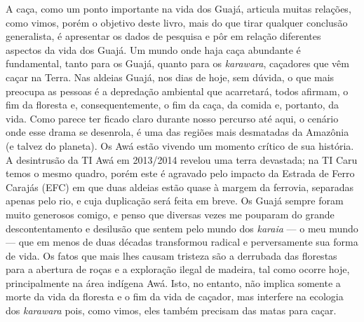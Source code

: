 A caça, como um ponto importante na vida dos Guajá, articula muitas
relações, como vimos, porém o objetivo deste livro, mais do que tirar
qualquer conclusão generalista, é apresentar os dados de pesquisa e pôr
em relação diferentes aspectos da vida dos Guajá. Um mundo onde haja
caça abundante é fundamental, tanto para os Guajá, quanto para os
\emph{karawara}, caçadores que vêm caçar na Terra. Nas aldeias Guajá,
nos dias de hoje, sem dúvida, o que mais preocupa as pessoas é a
depredação ambiental que acarretará, todos afirmam, o fim da floresta e,
consequentemente, o fim da caça, da comida e, portanto, da vida. Como
parece ter ficado claro durante nosso percurso até aqui, o cenário onde
esse drama se desenrola, é uma das regiões mais desmatadas da Amazônia
(e talvez do planeta). Os Awá estão vivendo um momento crítico de sua
história. A desintrusão da TI Awá em 2013/2014 revelou uma terra
devastada; na TI Caru temos o mesmo quadro, porém este é agravado pelo
impacto da Estrada de Ferro Carajás (EFC) em que duas aldeias estão
quase à margem da ferrovia, separadas apenas pelo rio, e cuja duplicação
será feita em breve. Os Guajá sempre foram muito generosos comigo, e
penso que diversas vezes me pouparam do grande descontentamento e
desilusão que sentem pelo mundo dos \emph{karaia} --- o meu mundo --- que em
menos de duas décadas transformou radical e perversamente sua forma de
vida. Os fatos que mais lhes causam tristeza são a derrubada das
florestas para a abertura de roças e a exploração ilegal de madeira, tal
como ocorre hoje, principalmente na área indígena Awá. Isto, no entanto,
não implica somente a morte da vida da floresta e o fim da vida de
caçador, mas interfere na ecologia dos \emph{karawara} pois, como vimos,
eles também precisam das matas para caçar.

